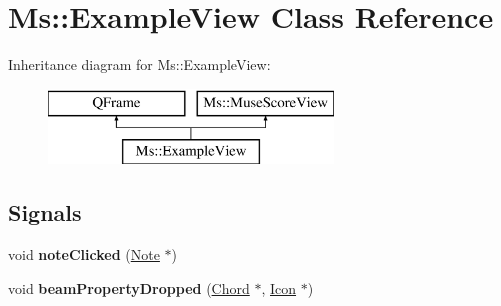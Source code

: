 \hypertarget{class_ms_1_1_example_view}{}\section{Ms\+:\+:Example\+View Class Reference}
\label{class_ms_1_1_example_view}
Inheritance diagram for Ms\+:\+:Example\+View\+:\begin{figure}[H]
\begin{center}
\leavevmode
\includegraphics[height=2.000000cm]{class_ms_1_1_example_view}
\end{center}
\end{figure}
\subsection*{Signals}
\begin{DoxyCompactItemize}
\item 
\mbox{\label{class_ms_1_1_example_view_a557dea86586d4cc855066c5acb3726f0}} 
void {\bfseries note\+Clicked} (\hyperlink{class_ms_1_1_note}{Note} $\ast$)
\item 
\mbox{\label{class_ms_1_1_example_view_ad7c64b9170bef97d0d54d2ca37b23858}} 
void {\bfseries beam\+Property\+Dropped} (\hyperlink{class_ms_1_1_chord}{Chord} $\ast$, \hyperlink{class_ms_1_1_icon}{Icon} $\ast$)
\end{DoxyCompactItemize}
